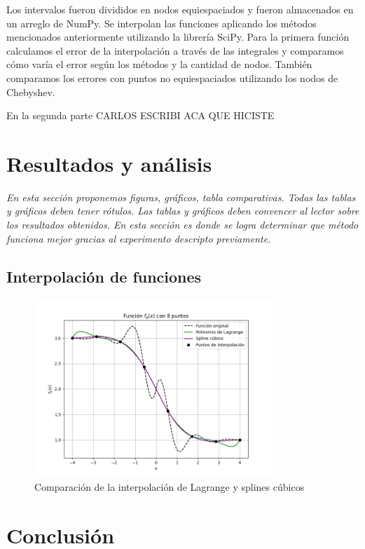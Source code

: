 \documentclass[12pt,a4]{article} %
\begin{document}
\begin{multicols}{2}
Los intervalos fueron divididos en nodos equiespaciados y fueron almacenados en un arreglo de NumPy. Se interpolan las funciones aplicando los métodos mencionados anteriormente utilizando la librería  SciPy. Para la primera función calculamos el error de la interpolación a través de las integrales y comparamos cómo varía el error según los métodos y la cantidad de nodos. También comparamos los errores con puntos no equiespaciados utilizando los nodos de Chebyshev.

En la segunda parte CARLOS ESCRIBI ACA QUE HICISTE

\section{Resultados y análisis}

\textit{En esta sección proponemos figuras, gráficos, tabla comparativas. Todas las tablas y gráficos deben tener rótulos. Las tablas y gráficos deben convencer al lector sobre los resultados obtenidos. En esta sección es donde se logra determinar que método funciona mejor gracias al experimento descripto previamente.}\\
\subsection{Interpolación de funciones }

\begin{figure}[H]
    \centering
    \includegraphics[width=0.8\textwidth]{lagrange_splines_equidistantes.png}
    \caption{Comparación de la interpolación de Lagrange y splines cúbicos}
    \label{fig:lagrange_splines}
\end{figure}

\section{Conclusión}


\end{multicols}
\end{document}
